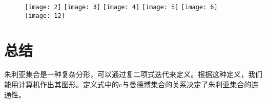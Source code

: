\documentclass{ctexart}
\begin{document}
\begin{figure}
\texttt{[image: 2]}
\texttt{[image: 3]}
\texttt{[image: 4]}
\texttt{[image: 5]}
\texttt{[image: 6]}
\texttt{[image: 12]}
\end{figure}

\section{总结}

朱利亚集合是一种复杂分形，可以通过复二项式迭代来定义。根据这种定义，我们能用计算机作出其图形。定义式中的c与曼德博集合的关系决定了朱利亚集合的连通性。



\end{document}

